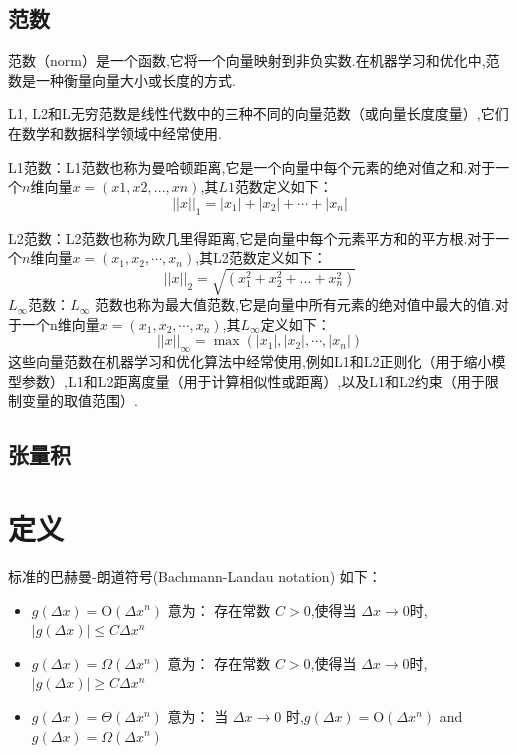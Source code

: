 \documentclass{book}
\begin{document}
\begin{example}
\begin{example}{}{}
\begin{example}
\begin{example}
\begin{example}
\subsection{范数}
范数（norm）是一个函数,它将一个向量映射到非负实数.在机器学习和优化中,范数是一种衡量向量大小或长度的方式.

L1, L2和L无穷范数是线性代数中的三种不同的向量范数（或向量长度度量）,它们在数学和数据科学领域中经常使用.

L1范数：L1范数也称为曼哈顿距离,它是一个向量中每个元素的绝对值之和.对于一个$n$维向量$x = (x1, x2, ..., xn)$,其$L1$范数定义如下：
\begin{equation}
    ||x||_1 = |x_1| + |x_2| + \cdots + |x_n|
\end{equation}

L2范数：L2范数也称为欧几里得距离,它是向量中每个元素平方和的平方根.对于一个$n$维向量$x = (x_1, x_2,\cdots, x_n)$,其L2范数定义如下：
\begin{equation}
    ||x||_2 = \sqrt{(x_1^2 + x_2^2 + ... + x_n^2)}
\end{equation}
$L_\infty$范数：$L_\infty$ 范数也称为最大值范数,它是向量中所有元素的绝对值中最大的值.对于一个n维向量$x = (x_1, x_2,\cdots, x_n)$,其$L_\infty$定义如下：
\begin{equation}
    ||x||_\infty = \max(|x_1|, |x_2|,\cdots, |x_n|)
\end{equation}
这些向量范数在机器学习和优化算法中经常使用,例如L1和L2正则化（用于缩小模型参数）,L1和L2距离度量（用于计算相似性或距离）,以及L1和L2约束（用于限制变量的取值范围）.
\subsection{张量积}


\section{定义}
\begin{definition}
    标准的巴赫曼-朗道符号(Bachmann-Landau notation) 如下：

    \begin{itemize}
        \item $g(\Delta x)=\mathrm{O}\left(\Delta x^{n}\right)$  意为： 存在常数 $C>0$,使得当 $\Delta x \rightarrow 0$时,$|g(\Delta x)| \leq C \Delta x^{n}$
        \item $g(\Delta x)=\Omega\left(\Delta x^{n}\right)$ 意为：  存在常数 $C>0$,使得当 $\Delta x \rightarrow 0$时,$|g(\Delta x)| \geq C \Delta x^{n}$
        \item $g(\Delta x)=\Theta\left(\Delta x^{n}\right)$  意为： 当 $\Delta x \rightarrow 0$ 时,$g(\Delta x)=\mathrm{O}\left(\Delta x^{n}\right)$  and  $g(\Delta x)=\Omega\left(\Delta x^{n}\right)$
    \end{itemize}


\end{definition}
\end{example}
\end{example}
\end{example}
\end{example}
\end{example}
\end{document}
